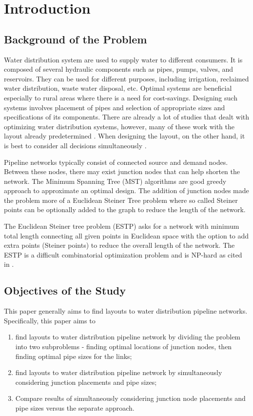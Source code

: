 \section{Introduction}
\subsection{Background of the Problem}
Water distribution system are used to supply water to different consumers. It is composed of several hydraulic components such as pipes, pumps, valves, and reservoirs. They can be used for different purposes, including irrigation, reclaimed water distribution, waste water disposal, etc. Optimal systems are beneficial especially to rural areas where there is a need for cost-savings. Designing such systems involves placement of pipes and selection of appropriate sizes and specifications of its components. There are already a lot of studies that dealt with optimizing water distribution systems, however, many of these work with the layout already predetermined \citep{Goncalves2000,Lee1984,Lejano2006}. When designing the layout, on the other hand, it is best to consider all decisions simultaneously \citep{Goncalves2000,Lee1984}.

Pipeline networks typically consist of connected source and demand nodes. Between these nodes, there may exist junction nodes that can help shorten the network. The Minimum Spanning Tree (MST) algorithms are good greedy approach to approximate an optimal design. The addition of junction nodes made the problem more of a Euclidean Steiner Tree problem where so called Steiner points can be optionally added to the graph to reduce the length of the network.

The Euclidean Steiner tree problem (ESTP) asks for a network with minimum total length connecting all given points in Euclidean space with the option to add extra points (Steiner points) to reduce the overall length of the network. The ESTP is a difficult combinatorial optimization problem and is NP-hard as cited in \cite{Brazil2014}.

\subsection{Objectives of the Study}
This paper generally aims to find layouts to water distribution pipeline networks. Specifically, this paper aims to
\begin{enumerate}
\item find layouts to water distribution pipeline network by dividing the problem into two subproblems - finding optimal locations of junction nodes, then finding optimal pipe sizes for the links;
\item find layouts to water distribution pipeline network by simultaneously considering junction placements and pipe sizes;
\item Compare results of simultaneously considering junction node placements and pipe sizes versus the separate approach.
\end{enumerate}